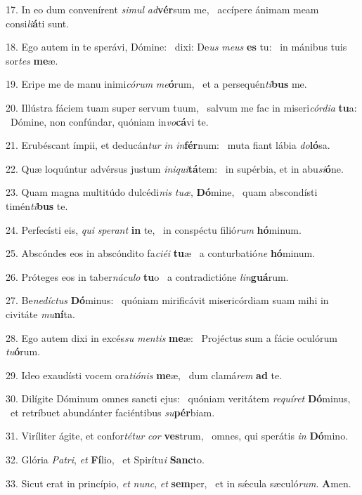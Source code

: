 17. In eo dum convenírent \textit{si}\textit{mul} \textit{ad}\textbf{vér}sum me, \ast\  accípere ánimam meam consi\textit{li}\textbf{á}ti sunt.\

18. Ego autem in te sperávi, Dómine: \dag\  dixi: De\textit{us} \textit{me}\textit{us} \textbf{es} tu: \ast\  in mánibus tuis sor\textit{tes} \textbf{me}æ.\

19. Eripe me de manu inimi\textit{có}\textit{rum} \textit{me}\textbf{ó}rum, \ast\  et a persequén\textit{ti}\textbf{bus} me.\

20. Illústra fáciem tuam super servum tuum, \dag\  salvum me fac in miseri\textit{cór}\textit{di}\textit{a} \textbf{tu}a: \ast\  Dómine, non confúndar, quóniam in\textit{vo}\textbf{cá}vi te.\

21. Erubéscant ímpii, et deducán\textit{tur} \textit{in} \textit{in}\textbf{fér}num: \ast\  muta fiant lábia \textit{do}\textbf{ló}sa.\

22. Quæ loquúntur advérsus justum \textit{in}\textit{i}\textit{qui}\textbf{tá}tem: \ast\  in supérbia, et in abu\textit{si}\textbf{ó}ne.\

23. Quam magna multitúdo dulcédi\textit{nis} \textit{tu}\textit{æ}, \textbf{Dó}mine, \ast\  quam abscondísti timén\textit{ti}\textbf{bus} te.\

24. Perfecísti eis, \textit{qui} \textit{spe}\textit{rant} \textbf{in} te, \ast\  in conspéctu filió\textit{rum} \textbf{hó}minum.\

25. Abscóndes eos in abscóndito fa\textit{ci}\textit{é}\textit{i} \textbf{tu}æ \ast\  a conturbatió\textit{ne} \textbf{hó}minum.\

26. Próteges eos in taber\textit{ná}\textit{cu}\textit{lo} \textbf{tu}o \ast\  a contradictióne \textit{lin}\textbf{guá}rum.\

27. Be\textit{ne}\textit{díc}\textit{tus} \textbf{Dó}minus: \ast\  quóniam mirificávit misericórdiam suam mihi in civitáte \textit{mu}\textbf{ní}ta.\

28. Ego autem dixi in excés\textit{su} \textit{men}\textit{tis} \textbf{me}æ: \ast\  Projéctus sum a fácie oculórum \textit{tu}\textbf{ó}rum.\

29. Ideo exaudísti vocem ora\textit{ti}\textit{ó}\textit{nis} \textbf{me}æ, \ast\  dum clamá\textit{rem} \textbf{ad} te.\

30. Dilígite Dóminum omnes sancti ejus: \dag\  quóniam veritátem \textit{re}\textit{quí}\textit{ret} \textbf{Dó}minus, \ast\  et retríbuet abundánter faciéntibus \textit{su}\textbf{pér}biam.\

31. Viríliter ágite, et confor\textit{té}\textit{tur} \textit{cor} \textbf{ves}trum, \ast\  omnes, qui sperátis \textit{in} \textbf{Dó}mino.\

32. Glória \textit{Pa}\textit{tri}, \textit{et} \textbf{Fí}lio, \ast\  et Spirítu\textit{i} \textbf{Sanc}to.\

33. Sicut erat in princípio, \textit{et} \textit{nunc}, \textit{et} \textbf{sem}per, \ast\  et in sǽcula sæculó\textit{rum}. \textbf{A}men.\

